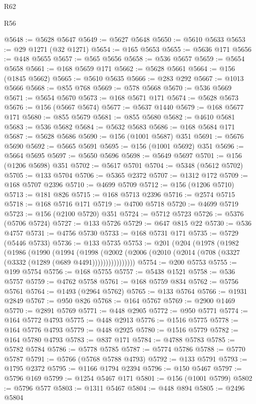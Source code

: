 \begin{lexlean}{R62}
\begin{lexlean}{R56}
\begin{coremodule}
{{{{{{{{{{{{{{{{{{{{{{{{{{{{{{{{{{{{{{{{{{{{{{{{{{{{{{{{{{{{{{{{{{{{{{{{{{{{{{{{{{{{{{{{{{{{{{{{{{{{{{{{{{{{{{{{{{{{{{{{{{{{{{{{{{{{{{{{{{{{{{{{{{{{{{{{{{{{{{{{{{{{{{{{{{{{{{{{{{{{{{{{{{{{{{{{{{{{{{{{{{{{{{{{{{{@5648 := @5628 @5647
@5649 := @5627 @5648
@5650 := @5610 @5633
@5653 := @29 @1271 (@32 @1271)
@5654 := @165 @5653
@5655 := @5636 @171
@5656 := @448 @5655
@5657 := @565 @5656
@5658 := @536 @5657
@5659 := @5654 @5658
@5661 := @168 @5659 @171
@5662 := @5628 @5661
@5664 := @156 (@1845 @5662)
@5665 := @5610 @5635
@5666 := @283 @292
@5667 := @1013 @5666
@5668 := @855 @768
@5669 := @578 @5668
@5670 := @536 @5669
@5671 := @5654 @5670
@5673 := @168 @5671 @171
@5674 := @5628 @5673
@5676 := @156 (@5667 @5674)
@5677 := @5637 @1440
@5679 := @168 @5677 @171
@5680 := @855 @5679
@5681 := @855 @5680
@5682 := @4610 @5681
@5683 := @536 @5682
@5684 := @5632 @5683
@5686 := @168 @5684 @171
@5687 := @5628 @5686
@5690 := @156 (@1001 @5687) @351
@5691 := @5676 @5690
@5692 := @5665 @5691
@5695 := @156 (@1001 @5692) @351
@5696 := @5664 @5695
@5697 := @5650 @5696
@5698 := @5649 @5697
@5701 := @156 (@1206 @5698) @351
@5702 := @5617 @5701
@5704 := @5348 (@5612 @5702)
@5705 := @133 @5704
@5706 := @5365 @2372
@5707 := @1312 @172
@5709 := @168 @5707 @2396
@5710 := @4699 @5709
@5712 := @156 (@1206 @5710)
@5713 := @181 @826
@5715 := @168 @5713 @2396
@5716 := @2574 @5715
@5718 := @168 @5716 @171
@5719 := @4700 @5718
@5720 := @4699 @5719
@5723 := @156 (@2100 @5720) @351
@5724 := @5712 @5723
@5726 := @5376 (@5706 @5724)
@5727 := @133 @5726
@5729 := @647 @815 @22
@5730 := @536 @4757
@5731 := @4756 @5730
@5733 := @168 @5731 @171
@5735 := @5729 (@5446 @5733)
@5736 := @133 @5735
@5753 := @201
    (@204
      (@1978
        (@1982
          (@1986
            (@1990
              (@1994
                (@1998
                  (@2002 (@2006 (@2010 (@2014 (@708 (@3327 (@3332 (@1289 (@689 @4491))))))))))))))))
@5754 := @200 @5753
@5755 := @199 @5754
@5756 := @168 @5755
@5757 := @5438 @1521
@5758 := @536 @5757
@5759 := @4762 @5758
@5761 := @168 @5759 @834
@5762 := @5756 @5761
@5764 := @1493 (@2964 @5762)
@5765 := @133 @5764
@5766 := @1931 @2849
@5767 := @950 @826
@5768 := @164 @5767
@5769 := @2900 @1469
@5770 := @2891 @5769
@5771 := @448 @2905
@5772 := @950 @5771
@5774 := @164 @5772 @4793
@5775 := @448 @2913
@5776 := @1516 @5775
@5778 := @164 @5776 @4793
@5779 := @448 @2925
@5780 := @1516 @5779
@5782 := @164 @5780 @4793
@5783 := @837 @171
@5784 := @4788 @5783
@5785 := @5782 @5784
@5786 := @5778 @5785
@5787 := @5774 @5786
@5788 := @5770 @5787
@5791 := @5766 (@5768 @5788 @4793)
@5792 := @133 @5791
@5793 := @1795 @2372
@5795 := @1166 @1794 @2394
@5796 := @150 @5467
@5797 := @5796 @169
@5799 := @1254 @5467 @171
@5801 := @156 (@1001 @5799)
@5802 := @5796 @577
@5803 := @1311 @5467
@5804 := @448 @894
@5805 := @2496 @5804
}}}}}}}}}}}}}}}}}}}}}}}}}}}}}}}}}}}}}}}}}}}}}}}}}}}}}}}}}}}}}}}}}}}}}}}}}}}}}}}}}}}}}}}}}}}}}}}}}}}}}}}}}}}}}}}}}}}}}}}}}}}}}}}}}}}}}}}}}}}}}}}}}}}}}}}}}}}}}}}}}}}}}}}}}}}}}}}}}}}}}}}}}}}}}}}}}}}}}}}}}}}}}}}}}}}
\end{coremodule}
\end{lexlean}
\end{lexlean}
